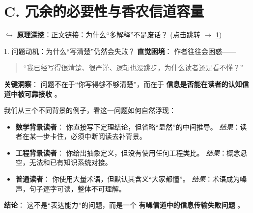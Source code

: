 \documentclass[11pt, a4paper]{ctexart}
\newcommand{\lowfreq}[1]{%
	{\Large\bfseries\color{red!60!black} #1}%
}
\newcommand{\mathlink}[2]{%
	\par\noindent\hspace*{2em}\small\color{blue!60!black}
	$\hookrightarrow$ \textbf{原理深挖}：#2 (点击跳转 $\to$ \ref{#1})
}
\begin{document}
\section{C. 冗余的必要性与香农信道容量} \label{math:channel}
\mathlink{math:channel}{正文链接：为什么“多解释”不是废话？}

\begin{mathbox}{1. 问题动机：为什么“写清楚”仍然会失败？}
	\textbf{直觉困境}：  
	作者往往会困惑——
	\begin{quote}
		“我已经写得很清楚、很严谨、逻辑也没跳步，为什么读者还是看不懂？”
	\end{quote}
	
	\textbf{关键洞察}：  
	问题不在于“你写得够不够清楚”，而在于\lowfreq{信息是否能在读者的认知信道中被可靠接收}。
	
	\vspace{0.5em}
	我们从三个不同背景的例子，看这一问题如何自然浮现：
	
	\begin{itemize}
		\item \textbf{数学背景读者}：  
		你直接写下定理结论，但省略“显然”的中间推导。  
		\textit{结果}：读者在某一步卡住，必须中断阅读去补背景。
		
		\item \textbf{工程背景读者}：  
		你给出抽象定义，但没有使用任何工程类比。  
		\textit{结果}：概念悬空，无法和已有知识系统对接。
		
		\item \textbf{普通读者}：  
		你使用大量术语，但默认其含义“大家都懂”。  
		\textit{结果}：术语成为噪声，句子逐字可读，整体不可理解。
	\end{itemize}
	
	\textbf{结论}：  
	这不是“表达能力”的问题，而是一个\lowfreq{有噪信道中的信息传输失败问题}。
\end{mathbox}
\end{document}
